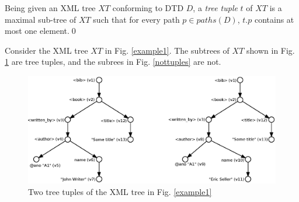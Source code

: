 \begin{define}\label{treeTuple}
Being given an XML tree $XT$ conforming to DTD $D$, a {\sl tree tuple} $t$ of $XT$ is a maximal sub-tree of $XT$ such that for every path $p \in paths(D)$, $t.p$ contains at most one element.\qed
\end{define}

\begin{example}
Consider the XML tree $XT$ in Fig. \ref{example1}. The subtrees of $XT$ shown in Fig. \ref{tuples} are tree tuples, and the subrees in Fig. \ref{nottuples} are not.

\begin{figure}[H]
    \centering\includegraphics[width=\textwidth]{tuples}
	\caption[Two tree tuples of the XML tree]{Two tree tuples of the XML tree in Fig. \ref{example1}} \label{tuples}
\end{figure}


\end{example}
